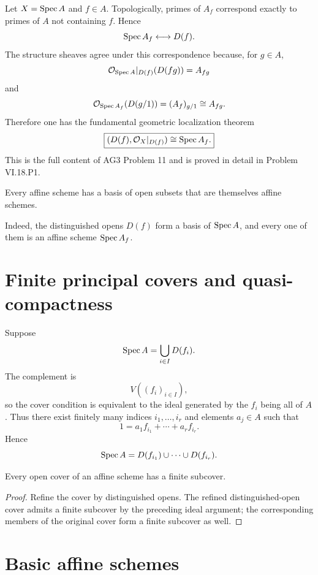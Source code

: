 Let $X=\operatorname{Spec} A$ and $f\in A$.  Topologically, primes of $A_f$ correspond exactly to
primes of $A$ not containing $f$.  Hence
\[
\operatorname{Spec} A_f\longleftrightarrow D(f).
\]
The structure sheaves agree under this correspondence because, for $g\in A$,
\[
\mathcal O_{\operatorname{Spec} A}|_{D(f)}(D(fg))=A_{fg}
\]
and
\[
\mathcal O_{\operatorname{Spec} A_f}(D(g/1))=(A_f)_{g/1}\cong A_{fg}.
\]
Therefore one has the fundamental geometric localization theorem
\[
\boxed{
  (D(f),\mathcal O_X|_{D(f)})\cong\operatorname{Spec} A_f.
}
\]
This is the full content of AG3 Problem 11 and is proved in detail in Problem
VI.18.P1.



\begin{corollary}
Every affine scheme has a basis of open subsets that are themselves affine schemes.
\end{corollary}

Indeed, the distinguished opens $D(f)$ form a basis of $\operatorname{Spec} A$, and every one of them is
an affine scheme $\operatorname{Spec} A_f$.

\section{Finite principal covers and quasi-compactness}

Suppose
\[
\operatorname{Spec} A=\bigcup_{i\in I}D(f_i).
\]
The complement is
\[
V((f_i)_{i\in I}),
\]
so the cover condition is equivalent to the ideal generated by the $f_i$ being all of $A$.
Thus there exist finitely many indices $i_1,\dots,i_r$ and elements $a_j\in A$ such that
\[
1=a_1f_{i_1}+\cdots+a_rf_{i_r}.
\]
Hence
\[
\operatorname{Spec} A=D(f_{i_1})\cup\cdots\cup D(f_{i_r}).
\]

\begin{theorem}
Every open cover of an affine scheme has a finite subcover.
\end{theorem}

\begin{proof}
Refine the cover by distinguished opens.  The refined distinguished-open cover admits a
finite subcover by the preceding ideal argument; the corresponding members of the original
cover form a finite subcover as well.
\end{proof}



\section{Basic affine schemes}

